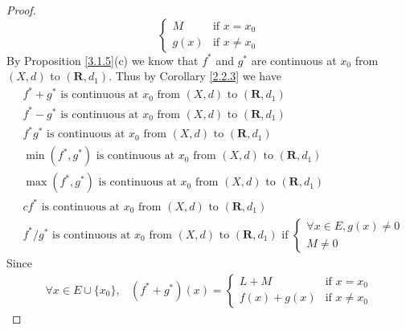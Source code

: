 \begin{proof}
\[\begin{cases}
            M    & \text{if } x = x_0    \\
            g(x) & \text{if } x \neq x_0
        \end{cases}
    \]
    By Proposition \ref{3.1.5}(c) we know that \(f^*\) and \(g^*\) are continuous at \(x_0\) from \((X, d)\) to \((\mathbf{R}, d_1)\).
    Thus by Corollary \ref{2.2.3} we have
    \begin{align*}
         & f^* + g^* \text{ is continuous at } x_0 \text{ from } (X, d) \text{ to } (\mathbf{R}, d_1)                                          \\
         & f^* - g^* \text{ is continuous at } x_0 \text{ from } (X, d) \text{ to } (\mathbf{R}, d_1)                                          \\
         & f^* g^* \text{ is continuous at } x_0 \text{ from } (X, d) \text{ to } (\mathbf{R}, d_1)                                            \\
         & \min(f^*, g^*) \text{ is continuous at } x_0 \text{ from } (X, d) \text{ to } (\mathbf{R}, d_1)                                     \\
         & \max(f^*, g^*) \text{ is continuous at } x_0 \text{ from } (X, d) \text{ to } (\mathbf{R}, d_1)                                     \\
         & c f^* \text{ is continuous at } x_0 \text{ from } (X, d) \text{ to } (\mathbf{R}, d_1)                                              \\
         & f^* / g^* \text{ is continuous at } x_0 \text{ from } (X, d) \text{ to } (\mathbf{R}, d_1) \text{ if } \begin{cases}
                                                                                                                      \forall x \in E, g(x) \neq 0 \\
                                                                                                                      M \neq 0
                                                                                                                  \end{cases}
    \end{align*}
    Since
    \begin{align*}
        \forall x \in E \cup \{x_0\}, & (f^* + g^*)(x) = \begin{cases}
                                                             L + M       & \text{if } x = x_0    \\
                                                             f(x) + g(x) & \text{if } x \neq x_0

\end{cases}
\end{align*}
\end{proof}
